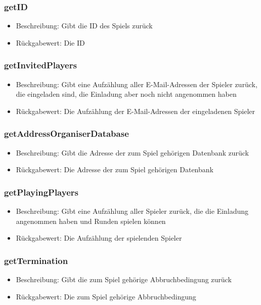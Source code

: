 \documentclass[a4paper]{scrreprt}
\begin{document}
	\subsubsection{getID}
	\begin{itemize}
		\item Beschreibung: Gibt die ID des Spiels zurück
		\item Rückgabewert: Die ID
	\end{itemize}
	\subsubsection{getInvitedPlayers}
	\begin{itemize}
		\item Beschreibung: Gibt eine Aufzählung aller E-Mail-Adressen der Spieler zurück, die eingeladen sind, die Einladung aber noch nicht angenommen haben
		\item Rückgabewert: Die Aufzählung der E-Mail-Adressen der eingeladenen Spieler
	\end{itemize}
	\subsubsection{getAddressOrganiserDatabase}
	\begin{itemize}
		\item Beschreibung: Gibt die Adresse der zum Spiel gehörigen Datenbank zurück
		\item Rückgabewert: Die Adresse der zum Spiel gehörigen Datenbank
	\end{itemize}
	\subsubsection{getPlayingPlayers}
	\begin{itemize}
		\item Beschreibung: Gibt eine Aufzählung aller Spieler zurück, die die Einladung angenommen haben und Runden spielen können
		\item Rückgabewert: Die Aufzählung der spielenden Spieler
	\end{itemize}
	\subsubsection{getTermination}
	\begin{itemize}
		\item Beschreibung: Gibt die zum Spiel gehörige Abbruchbedingung zurück
		\item Rückgabewert: Die zum Spiel gehörige Abbruchbedingung
	\end{itemize}
\end{document}
